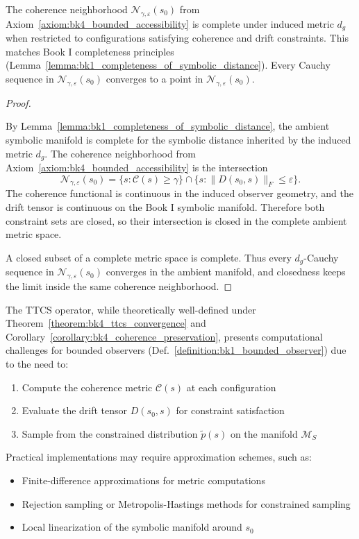 \begin{proposition}
\label{proposition:bk4_neighborhood_completeness}
The coherence neighborhood $\mathcal{N}_{\gamma,\varepsilon}(s_0)$ from
Axiom~\ref{axiom:bk4_bounded_accessibility} is complete under induced metric
$d_g$ when restricted to configurations satisfying coherence and drift
constraints.
This matches Book I completeness principles
(Lemma~\ref{lemma:bk1_completeness_of_symbolic_distance}).
Every Cauchy sequence in $\mathcal{N}_{\gamma,\varepsilon}(s_0)$ converges to a
point in $\mathcal{N}_{\gamma,\varepsilon}(s_0)$.
\end{proposition}

\begin{proof}
\label{proof:bk4_neighborhood_completeness}
\leavevmode

By Lemma~\ref{lemma:bk1_completeness_of_symbolic_distance}, the ambient symbolic
manifold is complete for the symbolic distance inherited by the induced metric
$d_g$. The coherence neighborhood from
Axiom~\ref{axiom:bk4_bounded_accessibility} is the intersection
\[
\mathcal N_{\gamma,\varepsilon}(s_0)
 =
\{s:\mathcal C(s)\geq\gamma\}
\cap
\{s:\|D(s_0,s)\|_F\leq\varepsilon\}.
\]
The coherence functional is continuous in the induced observer geometry, and
the drift tensor is continuous on the Book I symbolic manifold. Therefore both
constraint sets are closed, so their intersection is closed in the complete
ambient metric space.

A closed subset of a complete metric space is complete. Thus every
$d_g$-Cauchy sequence in
$\mathcal N_{\gamma,\varepsilon}(s_0)$ converges in the ambient manifold, and
closedness keeps the limit inside the same coherence neighborhood.
\end{proof}

\begin{remark}
\label{remark:bk4_computational_complexity}
The TTCS operator, while theoretically well-defined under Theorem~\ref{theorem:bk4_ttcs_convergence} and Corollary~\ref{corollary:bk4_coherence_preservation}, presents computational challenges for bounded observers (Def.~\ref{definition:bk1_bounded_observer}) due to the need to:
\begin{enumerate}
\item Compute the coherence metric $\mathcal{C}(s)$ at each configuration
\item Evaluate the drift tensor $D(s_0, s)$ for constraint satisfaction
\item Sample from the constrained distribution $\tilde{p}(s)$ on the manifold $\mathcal{M}_S$
\end{enumerate}

Practical implementations may require approximation schemes, such as:
\begin{itemize}
\item Finite-difference approximations for metric computations
\item Rejection sampling or Metropolis-Hastings methods for constrained sampling
\item Local linearization of the symbolic manifold around $s_0$
\end{itemize}
\end{remark}


